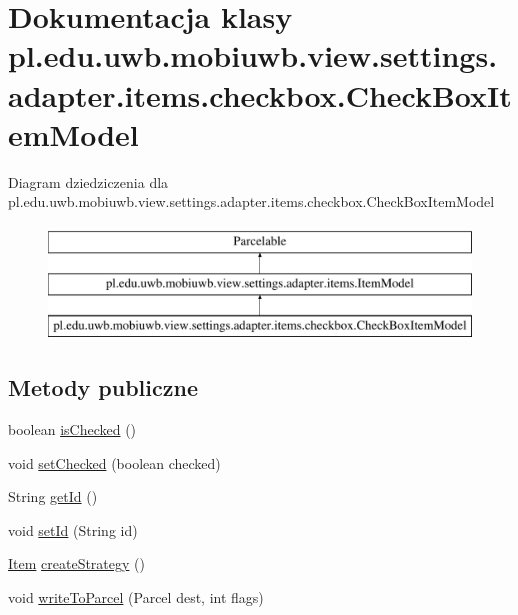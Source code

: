 \hypertarget{classpl_1_1edu_1_1uwb_1_1mobiuwb_1_1view_1_1settings_1_1adapter_1_1items_1_1checkbox_1_1_check_box_item_model}{}\section{Dokumentacja klasy pl.\+edu.\+uwb.\+mobiuwb.\+view.\+settings.\+adapter.\+items.\+checkbox.\+Check\+Box\+Item\+Model}
\label{classpl_1_1edu_1_1uwb_1_1mobiuwb_1_1view_1_1settings_1_1adapter_1_1items_1_1checkbox_1_1_check_box_item_model}
Diagram dziedziczenia dla pl.\+edu.\+uwb.\+mobiuwb.\+view.\+settings.\+adapter.\+items.\+checkbox.\+Check\+Box\+Item\+Model\begin{figure}[H]
\begin{center}
\leavevmode
\includegraphics[height=3.000000cm]{classpl_1_1edu_1_1uwb_1_1mobiuwb_1_1view_1_1settings_1_1adapter_1_1items_1_1checkbox_1_1_check_box_item_model}
\end{center}
\end{figure}
\subsection*{Metody publiczne}
\begin{DoxyCompactItemize}
\item 
boolean \hyperlink{classpl_1_1edu_1_1uwb_1_1mobiuwb_1_1view_1_1settings_1_1adapter_1_1items_1_1checkbox_1_1_check_box_item_model_a4a2470777d94c4228b6f5ea71bd5842d}{is\+Checked} ()
\item 
void \hyperlink{classpl_1_1edu_1_1uwb_1_1mobiuwb_1_1view_1_1settings_1_1adapter_1_1items_1_1checkbox_1_1_check_box_item_model_acfee24ec45095793b52e399166006a80}{set\+Checked} (boolean checked)
\item 
String \hyperlink{classpl_1_1edu_1_1uwb_1_1mobiuwb_1_1view_1_1settings_1_1adapter_1_1items_1_1checkbox_1_1_check_box_item_model_ad06c19137d60b88d774f38a650a028c2}{get\+Id} ()
\item 
void \hyperlink{classpl_1_1edu_1_1uwb_1_1mobiuwb_1_1view_1_1settings_1_1adapter_1_1items_1_1checkbox_1_1_check_box_item_model_a8dea5419a082045e7b0d0ad9e2477456}{set\+Id} (String id)
\item 
\hyperlink{classpl_1_1edu_1_1uwb_1_1mobiuwb_1_1view_1_1settings_1_1adapter_1_1items_1_1_item}{Item} \hyperlink{classpl_1_1edu_1_1uwb_1_1mobiuwb_1_1view_1_1settings_1_1adapter_1_1items_1_1checkbox_1_1_check_box_item_model_ae648371d43fd791f8f5cd1a0dc7cbc12}{create\+Strategy} ()
\item 
void \hyperlink{classpl_1_1edu_1_1uwb_1_1mobiuwb_1_1view_1_1settings_1_1adapter_1_1items_1_1checkbox_1_1_check_box_item_model_a5d2ef2e5fe82caf5b8376157eeea921a}{write\+To\+Parcel} (Parcel dest, int flags)
\end{DoxyCompactItemize}
